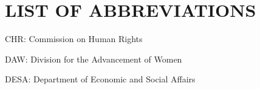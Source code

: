 \chapter*{\bf LIST OF ABBREVIATIONS} 

CHR: Commission on Human Rights 

DAW: Division for the Advancement of Women 

DESA: Department of Economic and Social Affairs 